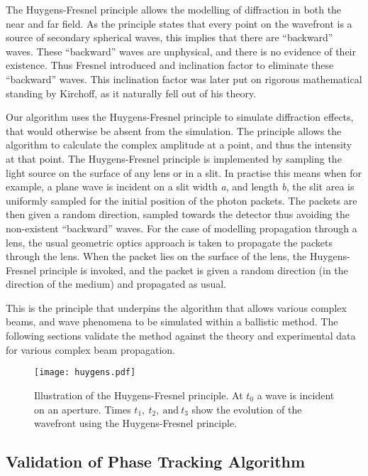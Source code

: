 The Huygens-Fresnel principle allows the modelling of diffraction in both the near and far field.
As the principle states that every point on the wavefront is a source of secondary spherical waves, this implies that there are ``backward'' waves.
These ``backward'' waves are unphysical, and there is no evidence of their existence.
Thus Fresnel introduced and inclination factor to eliminate these ``backward'' waves.
This inclination factor was later put on rigorous mathematical standing by Kirchoff, as it naturally fell out of his theory.~\cite{kirchhoff1883ann,born2000principles}

\medskip

Our algorithm uses the Huygens-Fresnel principle to simulate diffraction effects, that would otherwise be absent from the simulation.
The principle allows the algorithm to calculate the complex amplitude at a point, and thus the intensity at that point.
The Huygens-Fresnel principle is implemented by sampling the light source on the surface of any lens or in a slit.
In practise this means when for example, a plane wave is incident on a slit width \textit{a}, and length \textit{b}, the slit area is uniformly sampled for the initial position of the photon packets.
The packets are then given a random direction, sampled towards the detector thus avoiding the non-existent ``backward'' waves.
For the case of modelling propagation through a lens, the usual geometric optics approach is taken to propagate the packets through the lens.
When the packet lies on the surface of the lens, the Huygens-Fresnel principle is invoked, and the packet is given a random direction (in the direction of the medium) and propagated as usual.


This is the principle that underpins the algorithm that allows various complex beams, and wave phenomena to be simulated within a ballistic method. The following sections validate the method against the theory and experimental data for various complex beam propagation.

\begin{figure}[!ht]
    \centering
    \texttt{[image: huygens.pdf]}
    \caption{Illustration of the Huygens-Fresnel principle. At $t_0$ a wave is incident on an aperture. Times $t_1,\ t_2,\ \text{and}\ t_3$ show the evolution of the wavefront using the Huygens-Fresnel principle.}
    \label{fig:huygensillis}
\end{figure}

\subsection{Validation of Phase Tracking Algorithm}

